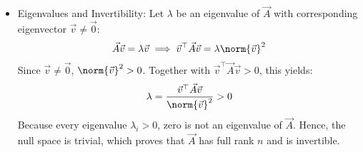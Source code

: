 \begin{enumerate}[label=\thesubsection.\arabic*, ref=\thesubsection.\theenumi]
\begin{itemize}
	\item Eigenvalues and Invertibility: Let $\lambda$ be an eigenvalue of $\vec{A}$ with corresponding eigenvector $\vec{v} \neq \vec{0}$:
	\begin{align}
		\vec{A}\vec{v} = \lambda \vec{v} \implies \vec{v}^{\top}\vec{A}\vec{v} = \lambda \norm{\vec{v}}^2
	\end{align}
	Since $\vec{v} \neq \vec{0}$, $\norm{\vec{v}}^2 > 0$. Together with $\vec{v}^{\top}\vec{A}\vec{v} > 0$, this yields:
	\begin{align}
		\lambda = \frac{\vec{v}^{\top}\vec{A}\vec{v}}{\norm{\vec{v}}^2} > 0
	\end{align}
	Because every eigenvalue $\lambda_i > 0$, zero is not an eigenvalue of $\vec{A}$. Hence, the null space is trivial, which proves that $\vec{A}$ has full rank $n$ and is invertible.
	

\end{itemize}
\end{enumerate}
